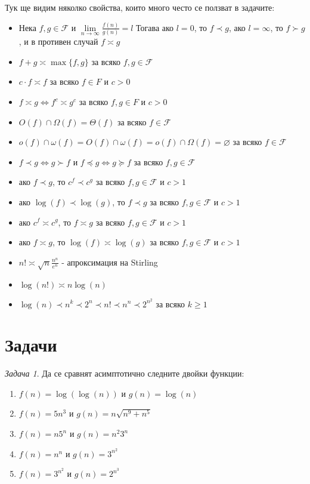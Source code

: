 \documentclass{article}
\newcommand{\F}{\mathcal{F}}
\theoremstyle{definition}
\theoremstyle{plain}
\theoremstyle{remark}
\newtheorem{problem}{Задача}
\theoremstyle{definition}
\begin{document}
Тук ще видим няколко свойства, които много често се ползват в задачите:
\begin{itemize}
  \item Нека $f, g \in \F$ и $\lim\limits_{n \rightarrow \infty} \frac{f(n)}{g(n)} = l$
    Тогава ако $l = 0$, то $f \prec g$, ако $l = \infty$, то $f \succ g$, и в противен случай $f \asymp g$
  \item $f + g \asymp \max\{f, g\}$ за всяко $f, g \in \F$
  \item $c \cdot f \asymp f$ за всяко $f \in F$ и $c > 0$
  \item $f \asymp g \iff f^c \asymp g^c$ за всяко $f, g \in F$ и $c > 0$
  \item $O(f) \cap \Omega(f) = \Theta(f)$ за всяко $f \in \F$
  \item $o(f) \cap \omega(f) = O(f) \cap \omega(f) = o(f) \cap \Omega(f) = \varnothing$ за всяко $f \in \F$
  \item $f \prec g \iff g \succ f$ и $f \preceq g \iff g \succeq f$ за всяко $f, g \in \F$
  \item ако $f \prec g$, то $c^f \prec c^g$ за всяко $f, g \in \F$ и $c > 1$
  \item ако $\log(f) \prec \log(g)$, то $f \prec g$ за всяко $f, g \in \F$ и $c > 1$
  \item ако $c^f \asymp c^g$, то $f \asymp g$ за всяко $f, g \in \F$ и $c > 1$
  \item ако $f \asymp g$, то $\log(f) \asymp \log(g)$ за всяко $f, g \in \F$ и $c > 1$
  \item $n! \asymp \sqrt{n} \frac{n^n}{e^n}$ - апроксимация на Stirling
  \item $\log(n!) \asymp n \log(n)$
  \item $\log(n) \prec n^k \prec 2^n \prec n! \prec n^n \prec 2^{n^2}$ за всяко $k \geq 1$
\end{itemize}

\section*{Задачи}

\begin{problem}
  Да се сравнят асимптотично следните двойки функции:
  \begin{enumerate}
    \item $f(n) = \log(\log(n))$ и $g(n) = \log(n)$
    \item $f(n) = 5n^3$ и $g(n) = n \sqrt{n^9 + n^5}$
    \item $f(n) = n 5^n$ и $g(n) = n^ 2 3^n$
    \item $f(n) = n^n$ и $g(n) = 3^{n^2}$
    \item $f(n) = 3^{n^2}$ и $g(n) = 2^{n^3}$
  \end{enumerate}
\end{problem}
\end{document}
